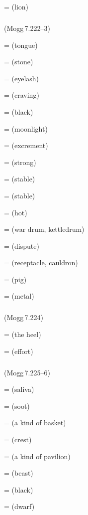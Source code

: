 =  (lion)\par

\subparagraph*{} (Mogg\,7.222--3)\label{pacckx:ha}

 =  (tongue)\par
{} =  (stone)\par
{} =  (eyelash)\par
{} =  (craving)\par
{} =  (black)\par
{} =  (moonlight)\par
{} =  (excrement)\par
{} =  (strong)\par
{} =  (stable)\par
{} =  (stable)\par
{} =  (hot)\par
{} =  (war drum, kettledrum)\par
{} =  (dispute)\par
{} =  (receptacle, cauldron)\par
{} =  (pig)\par
{} =  (metal)\par

\subparagraph*{} (Mogg\,7.224)\label{pacckx:hi}\label{pacckx:hii}

 =  (the heel)\par
{} =  (effort)\par

\subparagraph*{} (Mogg\,7.225--6)\label{pacckx:dla}

 =  (saliva)\par
{} =  (soot)\par
{} =  (a kind of basket)\par
{} =  (crest)\par
{} =  (a kind of pavilion)\par
{} =  (beast)\par
{} =  (black)\par
{} =  (dwarf)\par

